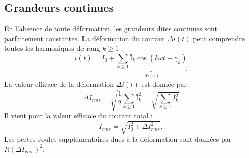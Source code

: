 	\subsection{Grandeurs continues}
		En l'absence de toute déformation, les grandeurs dites continues sont parfaitement constantes. La déformation du courant $\Delta i(t)$ peut comprendre toutes les harmoniques de rang $k\geq 1$ : 
		\begin{equation}
			i(t) = I_0 + \underbrace{\sum _{k\geq 1} Î_k \cos (k\omega t +\gamma _k)}_{\Delta i(t)}
		\end{equation}
		La valeur efficace de la déformation $\Delta i(t)$ est donnée par : 
		\begin{equation}
			\Delta I_{rms} = \sqrt{\frac{1}{2}\sum _{k\geq 1} Î_k^2} = \sqrt{\sum _{k\geq 1} I_k^2}
		\end{equation}
		Il vient pour la valeur efficace du courant total : 
		\begin{equation}
			I_{rms} = \sqrt{I_0^2+\Delta I^2_{rms}}.
		\end{equation}
		Les pertes Joules supplémentaires dues à la déformation sont données par $R(\Delta I_{rms})^2$. 
		

